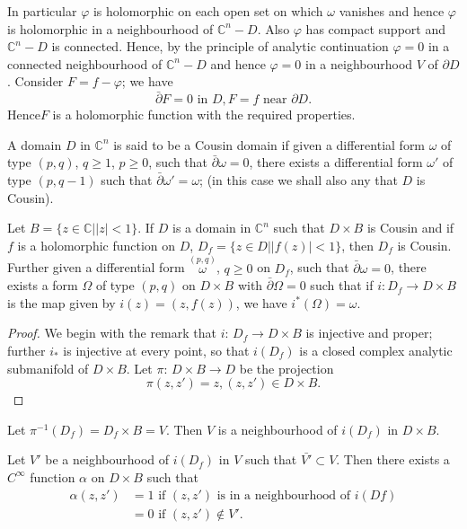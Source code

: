  In particular $\varphi$ is holomorphic on each open set on which
 $\omega$ vanishes and hence $\varphi$ is holomorphic in a
 neighbourhood of $\mathbb{C}^n - D$. Also $\varphi$ has compact
 support and $\mathbb{C}^n - D$ is connected. Hence, by the principle
 of analytic continuation $\varphi = 0$ in a connected neighbourhood
 of $\mathbb{C}^n - D$ and hence $\varphi = 0$ in a neighbourhood $V$
 of $\partial D$. Consider $F = f - \varphi$; we have  
 $$
 \bar{\partial} F = 0 \text{ in } D, F = f \text{ near } \partial D.
 $$
 Hence\pageoriginale $F$ is a holomorphic function with the required properties.
 
\begin{defi*}
  A domain $D$ in $\mathbb{C}^n$ is said to be a Cousin domain if
  given a differential form $\omega$ of type $(p,q)$, $q \geq 1$, $p
  \geq 0$, such that $\bar{\partial} \omega = 0$, there exists a
  differential form $\omega'$ of type $(p, q-1)$ such that
  $\bar{\partial} \omega' = \omega$; (in this case we shall also any
  that $D$ is Cousin). 
\end{defi*} 

\begin{theorem}[Oka]\label{chap2:sec8:thm2}%
  Let $B = \{z \in \mathbb{C} \big| |z| < 1 \}$. If $D$ is a domain in
  $\mathbb{C}^n$ such that $D \times B$ is Cousin and if $f$ is a
  holomorphic function on $D$, $D_f = \{z \in D \big| |f(z)| < 1 \}$, then
  $D_f$ is Cousin. Further given a differential form $\overset{(p,q)}
  \omega$, $q \geq 0$ on $D_f$, such that $\bar{\partial} \omega = 0$,
  there exists a form $\Omega$ of type $(p,q)$ on $D \times B$ with
  $\bar{\partial} \Omega = 0$ such that if $i: D_f \rightarrow D \times
  B$ is the map given by $i(z) = (z, f(z))$, we have $i^*
  (\Omega) = \omega$. 
\end{theorem} 

\begin{proof}
  We begin with the remark that $i$: $D_f \rightarrow D \times B$ is
  injective and proper; further $i_*$ is injective at every point, so
  that $i(D_f)$ is a closed complex analytic submanifold of $D \times
  B$. Let $\pi$: $D \times B \rightarrow D$ be the projection 
  $$
  \pi (z, z') = z, (z, z') \in D \times B.
  $$
\end{proof} 
 
Let $\pi^{-1} (D_f) = D_f \times B = V$. Then $V$ is a neighbourhood
of $i (D_f)$ in $D \times B$. 
 
Let $V'$ be a neighbourhood of $i(D_f)$ in $V$ such that $\bar{V'}
\subset V$. Then there exists a $C^\infty$ function $\alpha$ on $D
\times B$ such that 
\begin{align*}
  \alpha (z, z') & = 1 \text{ if } (z, z') \text{ is in a
    neighbourhood of } i(Df) \\ 
  & = 0 \text{ if } (z, z') \notin V'.
\end{align*} 
 
